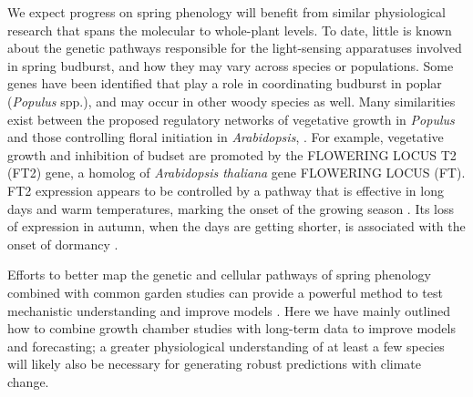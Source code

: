 \documentclass{article}
\begin{document}
\par We expect progress on spring phenology will benefit from similar physiological research that spans the molecular to whole-plant levels. To date, little is known about the genetic pathways responsible for the light-sensing apparatuses involved in spring budburst, and how they may vary across species or populations. Some genes have been identified that play a role in coordinating budburst in poplar (\emph{Populus} spp.), and may occur in other woody species as well. Many similarities exist between the proposed regulatory networks of vegetative growth in \emph{Populus} and those controlling floral initiation in \emph{Arabidopsis}, \citep{ding2016}. For example, vegetative growth and inhibition of budset are promoted by the FLOWERING LOCUS T2 (FT2) gene, a homolog of \emph{Arabidopsis thaliana} gene FLOWERING LOCUS (FT). FT2 expression appears to be controlled by a pathway that is effective in long days and warm temperatures, marking the onset of the growing season \citep{Hsu:2011}. Its loss of expression in autumn, when the days are getting shorter, is associated with the onset of dormancy \citep{glover2014}.

\par Efforts to better map the genetic and cellular pathways of spring phenology combined with common garden studies can provide a powerful method to test mechanistic understanding and improve models \citep[e.g.,][]{Burghardt2015,fournier2016}. Here we have mainly outlined how to combine growth chamber studies with long-term data to improve models and forecasting; a greater physiological understanding of at least a few species will likely also be necessary for generating robust predictions with climate change.

\end{document}
